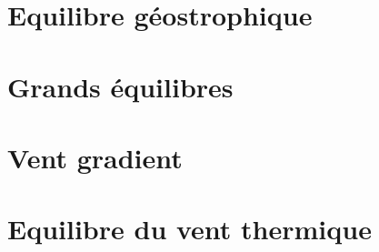 \documentclass[a4paper,DIV16,10pt]{scrartcl}
\begin{document}
\mk \section{Equilibre géostrophique}


\mk \section{Grands équilibres}


\mk \section{Vent gradient}


\mk \section{Equilibre du vent thermique}


%

%
\end{document}
